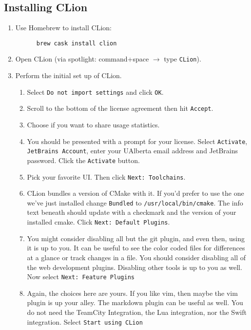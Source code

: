 \documentclass[../setup.tex]{subfiles}
\begin{document}
\subsection{Installing CLion}
\begin{enumerate}
  \item
    Use Homebrew to install CLion:
    \begin{lstlisting}
      brew cask install clion
    \end{lstlisting}
  \item
    Open CLion (via spotlight: command+space $\rightarrow$ type \texttt{CLion}).
  \item
    Perform the initial set up of CLion.
    \begin{enumerate}
      \item
        Select \texttt{Do not import settings} and click \texttt{OK}.
      \item
        Scroll to the bottom of the license agreement then hit \texttt{Accept}.
      \item
        Choose if you want to share usage statistics.
      \item
        You should be presented with a prompt for your license. Select \texttt{Activate},
        \texttt{JetBrains Account}, enter your UAlberta email address and JetBrains password.
        Click the \texttt{Activate} button.
      \item
        Pick your favorite UI. Then click \texttt{Next: Toolchains}.
      \item
        CLion bundles a version of CMake with it. If you'd prefer to use the one we've just
        installed change \texttt{Bundled} to \lstinline{/usr/local/bin/cmake}. The info text
        beneath should update with a checkmark and the version of your installed cmake. Click
        \texttt{Next: Default Plugins}.
      \item
        You might consider disabling all but the git plugin, and even then, using it is up to you.
        It can be useful to see the color coded files for differences at a glance or track changes
        in a file. You should consider disabling all of the web development plugins. Disabling
        other tools is up to you as well. Now select \texttt{Next: Feature Plugins}
      \item
        Again, the choices here are yours. If you like vim, then maybe the vim plugin is up your
        alley. The markdown plugin can be useful as well. You do not need the TeamCity Integration,
        the Lua integration, nor the Swift integration.
        Select \texttt{Start using CLion}
    \end{enumerate}
\end{enumerate}
\end{document}
